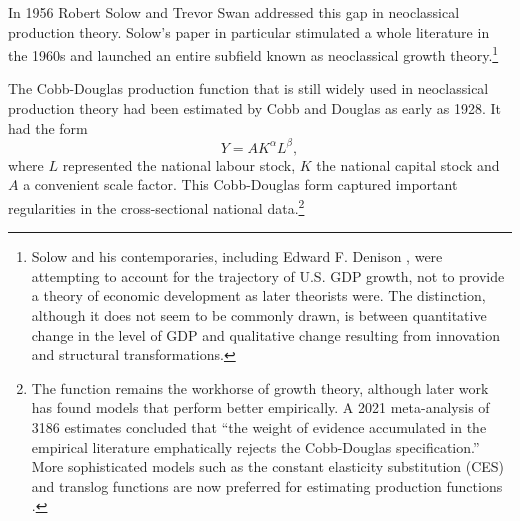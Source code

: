 In 1956 Robert Solow \cite{solowContributionTheoryEconomic1956} and Trevor Swan \cite{swanEconomicGrowthCapital1956}
addressed this gap in neoclassical production theory. Solow's paper in particular stimulated a whole literature in the 1960s and launched an entire subfield known as neoclassical growth theory.\footnote{Solow and his contemporaries, including Edward F. Denison \cite{denisonSourcesEconomicGrowth1962}, were attempting to account for the trajectory
of U.S. GDP growth, not to provide a theory of economic development as later theorists were. The distinction, although it does not seem to be commonly drawn, is between quantitative change in the level of GDP and qualitative change resulting from innovation and structural transformations.} %

The \gls{Cobb-Douglas} production function that is still widely used in neoclassical production theory had been estimated by Cobb and Douglas \cite{cobbTheoryProduction1928} as early as 1928. It had the form
\begin{equation*}
Y=AK^\alpha L^\beta, 
 \label{eqn-Cobb-Douglas}    
\end{equation*}
where $L$ represented the national labour stock, $K$ the national capital stock and  $A$ a convenient scale factor. This \gls{Cobb-Douglas} form captured important regularities in the cross-sectional national data.\footnote{The function remains the workhorse of growth theory, although later work has found models that perform better empirically.  A 2021 meta-analysis of 3186 estimates concluded that ``the weight of evidence accumulated in the empirical literature emphatically rejects the Cobb-Douglas specification.'' \cite{gechertMeasuringCapitallaborSubstitution2021}%
More sophisticated models such as the constant elasticity substitution (CES) and translog %
functions are now preferred for estimating production functions \cite{kimTranslogProductionFunction1992}.}  %

